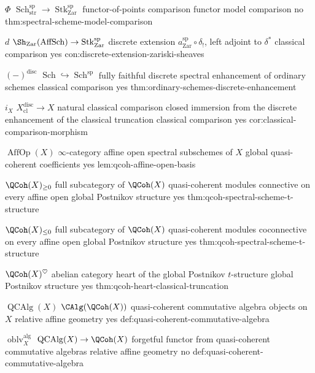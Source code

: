 \begin{longtable}
\CanonicalEntry
{\(\Phi\)}
{\(\operatorname{Sch}^{\mathrm{sp}}_{\mathrm{str}}\to\operatorname{Stk}^{\mathrm{sp}}_{\mathrm{Zar}}\)}
{functor-of-points comparison functor}
{model comparison}
{no}
{thm:spectral-scheme-model-comparison}

\CanonicalEntry
{\(d\)}
{\(\Sh_{\mathrm{Zar}}(\operatorname{AffSch})\to\operatorname{Stk}^{\mathrm{sp}}_{\mathrm{Zar}}\)}
{discrete extension \(a^{\mathrm{sp}}_{\mathrm{Zar}}\circ\delta_!\), left adjoint to \(\delta^*\)}
{classical comparison}
{yes}
{con:discrete-extension-zariski-sheaves}

\CanonicalEntry
{\((-)^{\mathrm{disc}}\)}
{\(\operatorname{Sch}\hookrightarrow\operatorname{Sch}^{\mathrm{sp}}\)}
{fully faithful discrete spectral enhancement of ordinary schemes}
{classical comparison}
{yes}
{thm:ordinary-schemes-discrete-enhancement}

\CanonicalEntry
{\(i_X\)}
{\(X_{\mathrm{cl}}^{\mathrm{disc}}\to X\)}
{natural classical comparison closed immersion from the discrete enhancement of the classical truncation}
{classical comparison}
{yes}
{cor:classical-comparison-morphism}

\CanonicalEntry
{\(\operatorname{AffOp}(X)\)}
{\(\infty\)-category}
{affine open spectral subschemes of \(X\)}
{global quasi-coherent coefficients}
{yes}
{lem:qcoh-affine-open-basis}

\CanonicalEntry
{\(\QCoh(X)_{\geq0}\)}
{full subcategory of \(\QCoh(X)\)}
{quasi-coherent modules connective on every affine open}
{global Postnikov structure}
{yes}
{thm:qcoh-spectral-scheme-t-structure}

\CanonicalEntry
{\(\QCoh(X)_{\leq0}\)}
{full subcategory of \(\QCoh(X)\)}
{quasi-coherent modules coconnective on every affine open}
{global Postnikov structure}
{yes}
{thm:qcoh-spectral-scheme-t-structure}

\CanonicalEntry
{\(\QCoh(X)^\heartsuit\)}
{abelian category}
{heart of the global Postnikov \(t\)-structure}
{global Postnikov structure}
{yes}
{thm:qcoh-heart-classical-truncation}

\CanonicalEntry
{\(\operatorname{QCAlg}(X)\)}
{\(\CAlg(\QCoh(X))\)}
{quasi-coherent commutative algebra objects on \(X\)}
{relative affine geometry}
{yes}
{def:quasi-coherent-commutative-algebra}

\CanonicalEntry
{\(\operatorname{oblv}^{\mathrm{alg}}_X\)}
{\(\operatorname{QCAlg}(X)\to\QCoh(X)\)}
{forgetful functor from quasi-coherent commutative algebras}
{relative affine geometry}
{no}
{def:quasi-coherent-commutative-algebra}


\end{longtable}

